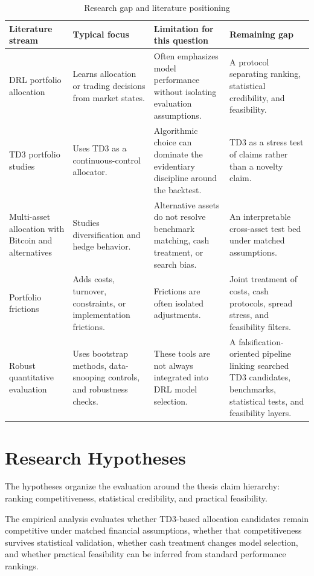 \documentclass[12pt]{article}
\begin{document}
\begin{table}[htbp]
\centering
\caption{Research gap and literature positioning}
\label{tab:research_gap_positioning}
\scriptsize
\begin{tabularx}{\textwidth}{L{0.21\textwidth}L{0.25\textwidth}L{0.25\textwidth}Y}
\toprule
\textbf{Literature stream} & \textbf{Typical focus} & \textbf{Limitation for this question} & \textbf{Remaining gap} \\
\midrule
DRL portfolio allocation & Learns allocation or trading decisions from market states. & Often emphasizes model performance without isolating evaluation assumptions. & A protocol separating ranking, statistical credibility, and feasibility. \\
TD3 portfolio studies & Uses TD3 as a continuous-control allocator. & Algorithmic choice can dominate the evidentiary discipline around the backtest. & TD3 as a stress test of claims rather than a novelty claim. \\
Multi-asset allocation with Bitcoin and alternatives & Studies diversification and hedge behavior. & Alternative assets do not resolve benchmark matching, cash treatment, or search bias. & An interpretable cross-asset test bed under matched assumptions. \\
Portfolio frictions & Adds costs, turnover, constraints, or implementation frictions. & Frictions are often isolated adjustments. & Joint treatment of costs, cash protocols, spread stress, and feasibility filters. \\
Robust quantitative evaluation & Uses bootstrap methods, data-snooping controls, and robustness checks. & These tools are not always integrated into DRL model selection. & A falsification-oriented pipeline linking searched TD3 candidates, benchmarks, statistical tests, and feasibility layers. \\
\bottomrule
\end{tabularx}
\end{table}

\newpage
\section{Research Hypotheses}

The hypotheses organize the evaluation around the thesis claim hierarchy: ranking competitiveness, statistical credibility, and practical feasibility.

The empirical analysis evaluates whether TD3-based allocation candidates remain competitive under matched financial assumptions, whether that competitiveness survives statistical validation, whether cash treatment changes model selection, and whether practical feasibility can be inferred from standard performance rankings.
\end{document}
